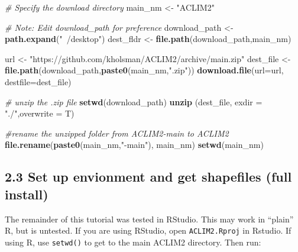 \documentclass[
]{article}
\newenvironment{Shaded}{\begin{snugshade}}{\end{snugshade}}
\newcommand{\CommentTok}[1]{\textcolor[rgb]{0.56,0.35,0.01}{\textit{#1}}}
\newcommand{\DataTypeTok}[1]{\textcolor[rgb]{0.13,0.29,0.53}{#1}}
\newcommand{\KeywordTok}[1]{\textcolor[rgb]{0.13,0.29,0.53}{\textbf{#1}}}
\newcommand{\NormalTok}[1]{#1}
\newcommand{\StringTok}[1]{\textcolor[rgb]{0.31,0.60,0.02}{#1}}
\begin{document}
\begin{Shaded}
\begin{Highlighting}[]
    \CommentTok{# Specify the download directory}
\NormalTok{    main_nm       <-}\StringTok{ "ACLIM2"}

    \CommentTok{# Note: Edit download_path for preference}
\NormalTok{    download_path <-}\StringTok{ }\KeywordTok{path.expand}\NormalTok{(}\StringTok{"~/desktop"}\NormalTok{)}
\NormalTok{    dest_fldr     <-}\StringTok{ }\KeywordTok{file.path}\NormalTok{(download_path,main_nm)}
    
\NormalTok{    url           <-}\StringTok{ "https://github.com/kholsman/ACLIM2/archive/main.zip"}
\NormalTok{    dest_file     <-}\StringTok{ }\KeywordTok{file.path}\NormalTok{(download_path,}\KeywordTok{paste0}\NormalTok{(main_nm,}\StringTok{".zip"}\NormalTok{))}
    \KeywordTok{download.file}\NormalTok{(}\DataTypeTok{url=}\NormalTok{url, }\DataTypeTok{destfile=}\NormalTok{dest_file)}
    
    \CommentTok{# unzip the .zip file}
    \KeywordTok{setwd}\NormalTok{(download_path)}
    \KeywordTok{unzip}\NormalTok{ (dest_file, }\DataTypeTok{exdir =} \StringTok{"./"}\NormalTok{,}\DataTypeTok{overwrite =}\NormalTok{ T)}
    
    \CommentTok{#rename the unzipped folder from ACLIM2-main to ACLIM2}
    \KeywordTok{file.rename}\NormalTok{(}\KeywordTok{paste0}\NormalTok{(main_nm,}\StringTok{"-main"}\NormalTok{), main_nm)}
    \KeywordTok{setwd}\NormalTok{(main_nm)}
\end{Highlighting}
\end{Shaded}

\hypertarget{set-up-envionment-and-get-shapefiles-full-install}{%
\subsection{2.3 Set up envionment and get shapefiles (full
install)}\label{set-up-envionment-and-get-shapefiles-full-install}}

The remainder of this tutorial was tested in RStudio. This may work in
``plain'' R, but is untested. If you are using RStudio, open
\texttt{ACLIM2.Rproj} in Rstudio. If using R, use \texttt{setwd()} to
get to the main ACLIM2 directory. Then run:

\begin{Shaded}
\end{Shaded}
\end{document}
